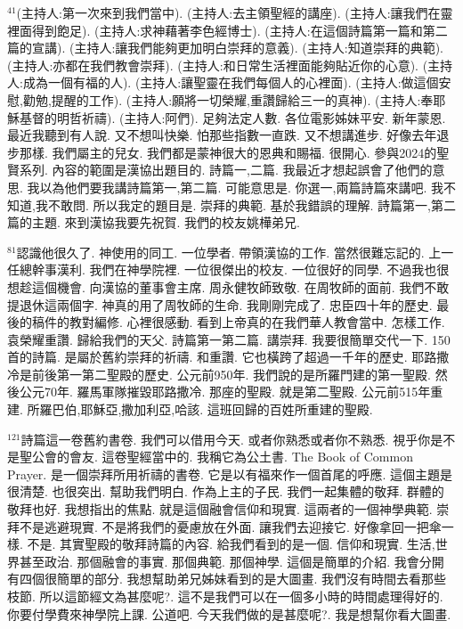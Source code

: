 \documentclass{book}
\begin{document}
$^{41}$(主持人:第一次來到我們當中).
(主持人:去主領聖經的講座).
(主持人:讓我們在靈裡面得到飽足).
(主持人:求神藉著李色經博士).
(主持人:在這個詩篇第一篇和第二篇的宣講).
(主持人:讓我們能夠更加明白崇拜的意義).
(主持人:知道崇拜的典範).
(主持人:亦都在我們教會崇拜).
(主持人:和日常生活裡面能夠貼近你的心意).
(主持人:成為一個有福的人).
(主持人:讓聖靈在我們每個人的心裡面).
(主持人:做這個安慰,勸勉,提醒的工作).
(主持人:願將一切榮耀,重讚歸給三一的真神).
(主持人:奉耶穌基督的明哲祈禱).
(主持人:阿們).
足夠法定人數.
各位電影姊妹平安.
新年蒙恩.
最近我聽到有人說.
又不想叫快樂.
怕那些指數一直跌.
又不想講進步.
好像去年退步那樣.
我們屬主的兒女.
我們都是蒙神很大的恩典和賜福.
很開心.
參與2024的聖賢系列.
內容的範圍是漢協出題目的.
詩篇一,二篇.
我最近才想起誤會了他們的意思.
我以為他們要我講詩篇第一,第二篇.
可能意思是.
你選一,兩篇詩篇來講吧.
我不知道,我不敢問.
所以我定的題目是.
崇拜的典範.
基於我錯誤的理解.
詩篇第一,第二篇的主題.
來到漢協我要先祝賀.
我們的校友姚樺弟兄.

$^{81}$認識他很久了.
神使用的同工.
一位學者.
帶領漢協的工作.
當然很難忘記的.
上一任總幹事漢利.
我們在神學院裡.
一位很傑出的校友.
一位很好的同學.
不過我也很想趁這個機會.
向漢協的董事會主席.
周永健牧師致敬.
在周牧師的面前.
我們不敢提退休這兩個字.
神真的用了周牧師的生命.
我剛剛完成了.
忠臣四十年的歷史.
最後的稿件的教對編修.
心裡很感動.
看到上帝真的在我們華人教會當中.
怎樣工作.
袁榮耀重讚.
歸給我們的天父.
詩篇第一第二篇.
講崇拜.
我要很簡單交代一下.
150首的詩篇.
是屬於舊約崇拜的祈禱.
和重讚.
它也橫跨了超過一千年的歷史.
耶路撒冷是前後第一第二聖殿的歷史.
公元前950年.
我們說的是所羅門建的第一聖殿.
然後公元70年.
羅馬軍隊摧毀耶路撒冷.
那座的聖殿.
就是第二聖殿.
公元前515年重建.
所羅巴伯,耶穌亞,撒加利亞,哈該.
這班回歸的百姓所重建的聖殿.

$^{121}$詩篇這一卷舊約書卷.
我們可以借用今天.
或者你熟悉或者你不熟悉.
視乎你是不是聖公會的會友.
這卷聖經當中的.
我稱它為公土書.
The Book of Common Prayer.
是一個崇拜所用祈禱的書卷.
它是以有福來作一個首尾的呼應.
這個主題是很清楚.
也很突出.
幫助我們明白.
作為上主的子民.
我們一起集體的敬拜.
群體的敬拜也好.
我想指出的焦點.
就是這個融會信仰和現實.
這兩者的一個神學典範.
崇拜不是逃避現實.
不是將我們的憂慮放在外面.
讓我們去迎接它.
好像拿回一把傘一樣.
不是.
其實聖殿的敬拜詩篇的內容.
給我們看到的是一個.
信仰和現實.
生活,世界甚至政治.
那個融會的事實.
那個典範.
那個神學.
這個是簡單的介紹.
我會分開有四個很簡單的部分.
我想幫助弟兄姊妹看到的是大圖畫.
我們沒有時間去看那些枝節.
所以這節經文為甚麼呢?.
這不是我們可以在一個多小時的時間處理得好的.
你要付學費來神學院上課.
公道吧.
今天我們做的是甚麼呢?.
我是想幫你看大圖畫.
\end{document}
